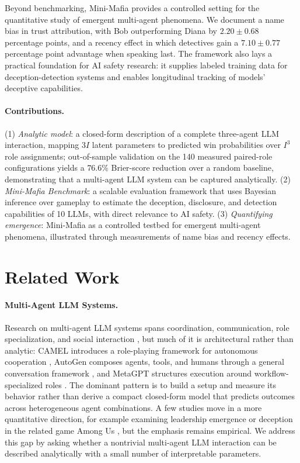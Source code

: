 \documentclass[sigconf]{aamas}
\begin{document}
Beyond benchmarking, Mini-Mafia provides a controlled setting for the quantitative study of emergent multi-agent phenomena. We document a name bias in trust attribution, with Bob outperforming Diana by $2.20 \pm 0.68$ percentage points, and a recency effect in which detectives gain a $7.10 \pm 0.77$ percentage point advantage when speaking last. The framework also lays a practical foundation for AI safety research: it supplies labeled training data for deception-detection systems and enables longitudinal tracking of models' deceptive capabilities.

\paragraph{Contributions.} (1) \textit{Analytic model}: a closed-form description of a complete three-agent LLM interaction, mapping $3I$ latent parameters to predicted win probabilities over $I^3$ role assignments; out-of-sample validation on the 140 measured paired-role configurations yields a $76.6\%$ Brier-score reduction over a random baseline, demonstrating that a multi-agent LLM system can be captured analytically. (2) \textit{Mini-Mafia Benchmark}: a scalable evaluation framework that uses Bayesian inference over gameplay to estimate the deception, disclosure, and detection capabilities of 10 LLMs, with direct relevance to AI safety. (3) \textit{Quantifying emergence}: Mini-Mafia as a controlled testbed for emergent multi-agent phenomena, illustrated through measurements of name bias and recency effects.



\section{Related Work}
\label{sec:related_work}

\paragraph{Multi-Agent LLM Systems.} Research on multi-agent LLM systems spans coordination, communication, role specialization, and social interaction \citep{gao2024large, guo2024large, wang2024survey, hou2024egosocialarena}, but much of it is architectural rather than analytic: CAMEL introduces a role-playing framework for autonomous cooperation \citep{li2023camel}, AutoGen composes agents, tools, and humans through a general conversation framework \citep{wu2023autogen}, and MetaGPT structures execution around workflow-specialized roles \citep{hong2023metagpt}. The dominant pattern is to build a setup and measure its behavior rather than derive a compact closed-form model that predicts outcomes across heterogeneous agent combinations. A few studies move in a more quantitative direction, for example examining leadership emergence \citep{du2024helmsman} or deception in the related game Among Us \citep{bansal2025amonus}, but the emphasis remains empirical. We address this gap by asking whether a nontrivial multi-agent LLM interaction can be described analytically with a small number of interpretable parameters.
\end{document}
